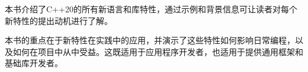 本书介绍了C++20的所有新语言和库特性，通过示例和背景信息可让读者对每个新特性的提出动机进行了解。

本书的重点在于新特性在实践中的应用，并演示了这些特性如何影响日常编程，以及如何在项目中从中受益。这既适用于应用程序开发者，也适用于提供通用框架和基础库开发者。